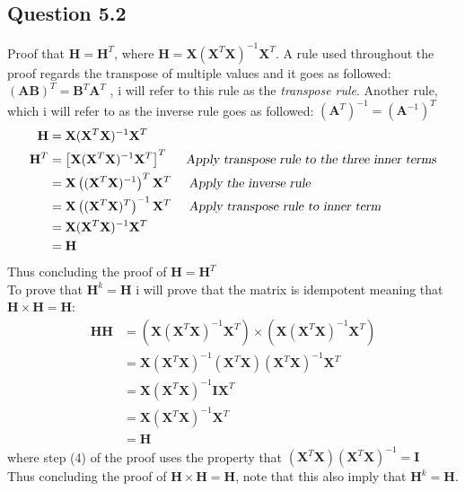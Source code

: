 \documentclass{article}
\begin{document}
\subsection{Question 5.2}
Proof that $\mathbf{H} = \mathbf{H}^T $, where $\mathbf{H} = \mathbf{X}(\mathbf{X}^T \mathbf{X})^{-1}\mathbf{X}^T$. A rule used throughout the proof regards the transpose of multiple values and it goes as followed: $ (\mathbf{A} \mathbf{B})^T = \mathbf{B} ^T \mathbf{A}^T $ , i will refer to this rule as the \textit{transpose rule}. Another rule, which i will refer to as the inverse rule goes as followed: $ (\mathbf{A}^{T})^{-1} = (\mathbf{A}^{-1})^{T} $
\begin{align*}
\mathbf{H} &= \mathbf{X}(\mathbf{X}^T \mathbf{X})^{-1}\mathbf{X}^T \\
\mathbf{H}^T &= \left[\mathbf{X}(\mathbf{X}^T \mathbf{X})^{-1}\mathbf{X}^T \right]^T  \hspace{0.5cm} \textsl{Apply transpose rule to the three inner terms} \\
&= \mathbf{X} \left( (\mathbf{X}^T \mathbf{X})^{-1}\right)^T \mathbf{X}^T \hspace{0.5cm} \textsl{Apply the inverse rule}  \\
&= \mathbf{X} \left( (\mathbf{X}^T \mathbf{X})^{T}\right)^{-1} \mathbf{X}^T \hspace{0.5cm} \textsl{Apply transpose rule to inner term} \\
&= \mathbf{X}  (\mathbf{X}^T \mathbf{X})^{-1}\mathbf{X}^T \\
&= \mathbf{H}
\end{align*}
Thus concluding the proof of $\mathbf{H} = \mathbf{H}^T $
\\
To prove that $\mathbf{H}^k = \mathbf{H}$ i will prove that the matrix is idempotent meaning that $\mathbf{H} \times \mathbf{H} = \mathbf{H}$:
\begin{align}
\mathbf{H}\mathbf{H} &= (\mathbf{X}(\mathbf{X}^T \mathbf{X})^{-1}\mathbf{X}^T) \times (\mathbf{X}(\mathbf{X}^T \mathbf{X})^{-1}\mathbf{X}^T) \\
&= \mathbf{X}(\mathbf{X}^T\mathbf{X})^{-1} (\mathbf{X}^T\mathbf{X})(\mathbf{X}^T\mathbf{X})^{-1} \mathbf{X}^T\\
&= \mathbf{X}(\mathbf{X}^T\mathbf{X})^{-1}  \mathbf{I} \mathbf{X}^T \\
&= \mathbf{X}(\mathbf{X}^T\mathbf{X})^{-1}  \mathbf{X}^T \\
&= \mathbf{H}
\end{align}
where step (4) of the proof uses the property that 
$  (\mathbf{X}^T\mathbf{X})(\mathbf{X}^T\mathbf{X})^{-1} = \mathbf{I} $ \\
Thus concluding the proof of $\mathbf{H} \times \mathbf{H} = \mathbf{H}$, note that this also imply that $\mathbf{H}^k = \mathbf{H}$.
\end{document}
